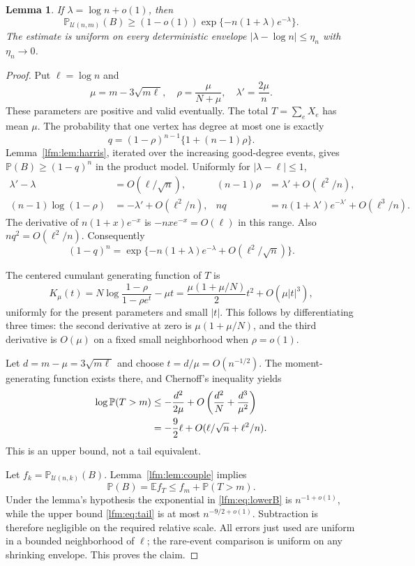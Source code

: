 \documentclass[11pt,letterpaper]{article}
\newtheorem{lemma}[theorem]{Lemma}
\theoremstyle{remark}\newtheorem{remark}[theorem]{Remark}
\newcommand{\Prob}{\mathbb P}\newcommand{\E}{\mathbb E}
\newcommand{\U}{\mathcal U}\newcommand{\dd}{\,\mathrm d}
\begin{document}
\begin{lemma}\label{lfm:lem:rare-lower}
If $\lambda=\log n+o(1)$, then
\begin{equation}
 \Prob_{\U(n,m)}(B)\ge(1-o(1))
 \exp\{-n(1+\lambda)e^{-\lambda}\}.\label{lfm:eq:lowerB}
\end{equation}
The estimate is uniform on every deterministic envelope
$|\lambda-\log n|\le\eta_n$ with $\eta_n\to0$.
\end{lemma}
\begin{proof}
Put $\ell=\log n$ and
\[
 \mu=m-3\sqrt{m\ell},\quad \rho=\frac\mu{N+\mu},\quad
 \lambda'=\frac{2\mu}{n}.
\]
These parameters are positive and valid eventually. The total $T=\sum_eX_e$ has mean $\mu$. The probability that one vertex has degree at most one is exactly
\[
 q=(1-\rho)^{n-1}\{1+(n-1)\rho\}.
\]
Lemma~\ref{lfm:lem:harris}, iterated over the increasing good-degree events, gives $\Prob(B)\ge(1-q)^n$ in the product model. Uniformly for $|\lambda-\ell|\le1$,
\begin{align*}
 \lambda'-\lambda&=O(\ell/\sqrt n),&
 (n-1)\rho&=\lambda'+O(\ell^2/n),\\
 (n-1)\log(1-\rho)&=-\lambda'+O(\ell^2/n),&
 nq&=n(1+\lambda')e^{-\lambda'}+O(\ell^3/n).
\end{align*}
The derivative of $n(1+x)e^{-x}$ is $-nxe^{-x}=O(\ell)$ in this range. Also $nq^2=O(\ell^2/n)$. Consequently
\begin{equation}
 (1-q)^n=\exp\{-n(1+\lambda)e^{-\lambda}+O(\ell^2/\sqrt n)\}.\label{lfm:eq:harrisquant}
\end{equation}

The centered cumulant generating function of $T$ is
\begin{equation}
 K_\mu(t)=N\log\frac{1-\rho}{1-\rho e^t}-\mu t
 =\frac{\mu(1+\mu/N)}2t^2+O(\mu|t|^3),\label{lfm:eq:mgf}
\end{equation}
uniformly for the present parameters and small $|t|$. This follows by differentiating three times: the second derivative at zero is $\mu(1+\mu/N)$, and the third derivative is $O(\mu)$ on a fixed small neighborhood when $\rho=o(1)$.

Let $d=m-\mu=3\sqrt{m\ell}$ and choose $t=d/\mu=O(n^{-1/2})$. The moment-generating function exists there, and Chernoff's inequality yields
\begin{align}
 \log\Prob(T>m)
 &\le-\frac{d^2}{2\mu}
 +O\left(\frac{d^2}{N}+\frac{d^3}{\mu^2}\right)\notag\\
 &=-\frac92\ell+O(\ell/\sqrt n+\ell^2/n).\label{lfm:eq:tail}
\end{align}
This is an upper bound, not a tail equivalent.

Let $f_k=\Prob_{\U(n,k)}(B)$. Lemma~\ref{lfm:lem:couple} implies
\[
 \Prob(B)=\E f_T\le f_m+\Prob(T>m).
\]
Under the lemma's hypothesis the exponential in \eqref{lfm:eq:lowerB} is $n^{-1+o(1)}$, while the upper bound \eqref{lfm:eq:tail} is at most $n^{-9/2+o(1)}$. Subtraction is therefore negligible on the required relative scale. All errors just used are uniform in a bounded neighborhood of $\ell$; the rare-event comparison is uniform on any shrinking envelope. This proves the claim.
\end{proof}
\end{document}
